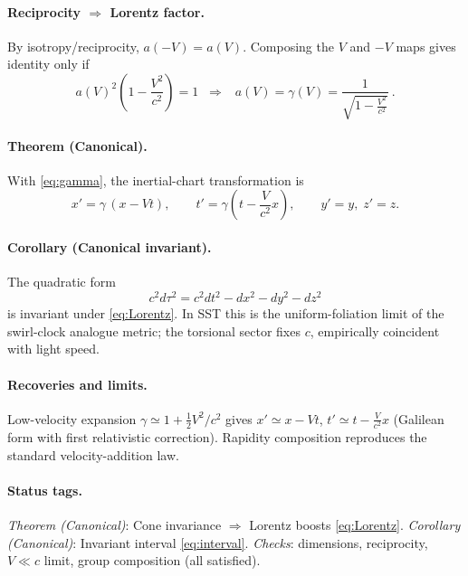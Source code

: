 \documentclass[10pt,reprint,aps,onecolumn,nofootinbib]{revtex4-2}
\begin{document}
        \paragraph{Reciprocity $\Rightarrow$ Lorentz factor.}
            By isotropy/reciprocity, $a(-V)=a(V)$. Composing the $V$ and $-V$ maps gives identity only if
            \begin{equation}
                a(V)^2\!\left(1 - \frac{V^2}{c^2}\right)=1
                \;\;\Rightarrow\;\;
                \boxed{~a(V)=\gamma(V)=\frac{1}{\sqrt{1-\tfrac{V^2}{c^2}}}~}. \label{eq:gamma}
            \end{equation}

        \paragraph{Theorem (Canonical).}
            With \eqref{eq:gamma}, the inertial-chart transformation is
            \begin{equation}
                \boxed{~x'=\gamma\,(x - Vt),\qquad t'=\gamma\!\left(t - \frac{V}{c^{2}}x\right),\qquad y'=y,\; z'=z.~} \label{eq:Lorentz}
            \end{equation}

        \paragraph{Corollary (Canonical invariant).}
            The quadratic form
            \begin{equation}
                \boxed{~c^2 d\tau^2 = c^2 dt^2 - dx^2 - dy^2 - dz^2~} \label{eq:interval}
            \end{equation}
            is invariant under \eqref{eq:Lorentz}. In SST this is the uniform-foliation limit of the swirl-clock analogue metric; the torsional sector fixes $c$, empirically coincident with light speed.

        \paragraph{Recoveries and limits.}
            Low-velocity expansion $\gamma\simeq 1+\tfrac{1}{2}V^2/c^2$ gives $x'\simeq x-Vt$, $t'\simeq t-\tfrac{V}{c^{2}}x$ (Galilean form with first relativistic correction). Rapidity composition reproduces the standard velocity-addition law.

        \paragraph{Status tags.}
            \emph{Theorem (Canonical)}: Cone invariance $\Rightarrow$ Lorentz boosts \eqref{eq:Lorentz}. \;
            \emph{Corollary (Canonical)}: Invariant interval \eqref{eq:interval}. \;
            \emph{Checks}: dimensions, reciprocity, $V\!\ll\!c$ limit, group composition (all satisfied).
\end{document}
